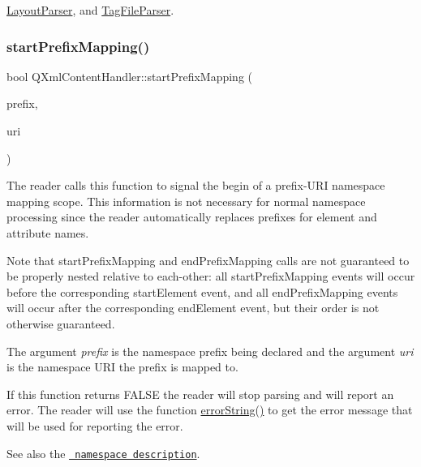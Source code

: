 \mbox{\hyperlink{class_layout_parser_aa870786ef488ce9d300214dab2c497ae}{Layout\+Parser}}, and \mbox{\hyperlink{class_tag_file_parser_ad9f6b4e83d37df58b95a2018d4e2e606}{Tag\+File\+Parser}}.

\mbox{\label{class_q_xml_content_handler_acdf18588f1980d19d12efd025a5f5cc9}} 
\subsubsection{\texorpdfstring{startPrefixMapping()}{startPrefixMapping()}}
{\footnotesize\ttfamily bool Q\+Xml\+Content\+Handler\+::start\+Prefix\+Mapping (\begin{DoxyParamCaption}\item[{const \mbox{\hyperlink{class_q_string}{Q\+String}} \&}]{prefix,  }\item[{const \mbox{\hyperlink{class_q_string}{Q\+String}} \&}]{uri }\end{DoxyParamCaption})\hspace{0.3cm}{\ttfamily [pure virtual]}}

The reader calls this function to signal the begin of a prefix-\/\+U\+RI namespace mapping scope. This information is not necessary for normal namespace processing since the reader automatically replaces prefixes for element and attribute names.

Note that start\+Prefix\+Mapping and end\+Prefix\+Mapping calls are not guaranteed to be properly nested relative to each-\/other\+: all start\+Prefix\+Mapping events will occur before the corresponding start\+Element event, and all end\+Prefix\+Mapping events will occur after the corresponding end\+Element event, but their order is not otherwise guaranteed.

The argument {\itshape prefix} is the namespace prefix being declared and the argument {\itshape uri} is the namespace U\+RI the prefix is mapped to.

If this function returns F\+A\+L\+SE the reader will stop parsing and will report an error. The reader will use the function \mbox{\hyperlink{class_q_xml_content_handler_adba96547bad1cf1b009dbfb7b7c571be}{error\+String()}} to get the error message that will be used for reporting the error.

See also the \href{xml-sax.html\#namespaces}{\texttt{ namespace description}}.

